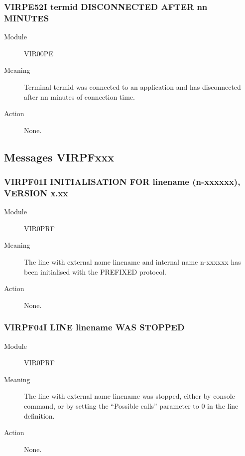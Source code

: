 \documentclass[letterpaper,10pt,english]{sphinxmanual}
\begin{document}
\subsubsection{VIRPE52I termid DISCONNECTED AFTER nn MINUTES}
\label{\detokenize{messages:virpe52i-termid-disconnected-after-nn-minutes}}\begin{description}
\item[{Module}] \leavevmode
VIR00PE

\item[{Meaning}] \leavevmode
Terminal termid was connected to an application and has disconnected after nn minutes of connection time.

\item[{Action}] \leavevmode
None.

\end{description}


\subsection{Messages VIRPFxxx}
\label{\detokenize{messages:messages-virpfxxx}}

\subsubsection{VIRPF01I INITIALISATION FOR linename (n-xxxxxx), VERSION x.xx}
\label{\detokenize{messages:virpf01i-initialisation-for-linename-n-xxxxxx-version-x-xx}}\begin{description}
\item[{Module}] \leavevmode
VIR0PRF

\item[{Meaning}] \leavevmode
The line with external name linename and internal name n-xxxxxx has been initialised with the PREFIXED protocol.

\item[{Action}] \leavevmode
None.

\end{description}


\subsubsection{VIRPF04I LINE linename WAS STOPPED}
\label{\detokenize{messages:virpf04i-line-linename-was-stopped}}\begin{description}
\item[{Module}] \leavevmode
VIR0PRF

\item[{Meaning}] \leavevmode
The line with external name linename was stopped, either by console command, or by setting the “Possible calls” parameter to 0 in the line definition.

\item[{Action}] \leavevmode
None.

\end{description}
\end{document}

